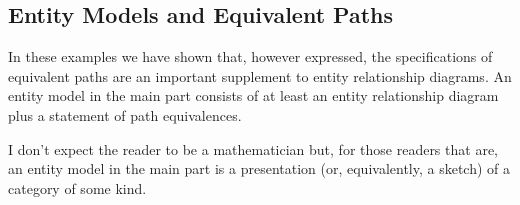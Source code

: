 \subsection{Entity Models and Equivalent Paths}
\mynote
In these examples we have shown that, however expressed,  the specifications of equivalent paths are
an important supplement to entity relationship diagrams. 
An entity model in the main part consists of at least an entity relationship diagram  
plus a statement of path equivalences.

\begin{reinstatett}


\end{reinstatett}

\mynote
I don't expect the reader to be a mathematician but, for those readers that are, an entity model in the main part is a presentation 
(or, equivalently, a sketch) of a category of some kind. 
